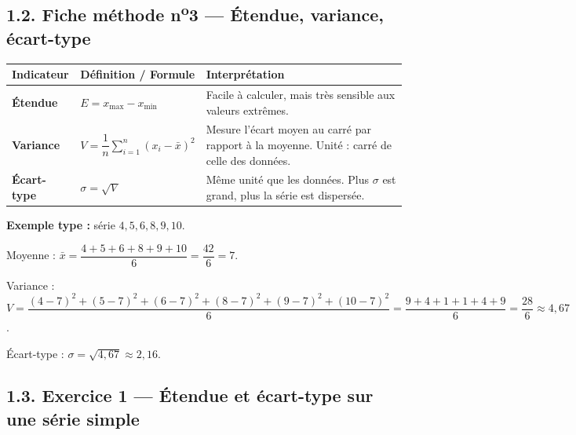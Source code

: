 \documentclass[11pt,a4paper]{article}
\begin{document}
\subsection*{1.2. Fiche méthode n\textsuperscript{o}3 — Étendue, variance, écart-type}

\begin{rappel}[title={\textbf{Fiche méthode — Indicateurs de dispersion}}]
\begin{tabularx}{\linewidth}{|p{2.6cm}|X|p{3.6cm}|}
\hline
\textbf{Indicateur} & \textbf{Définition / Formule} & \textbf{Interprétation} \\
\hline
\textbf{Étendue} & $E = x_{\max} - x_{\min}$ & Facile à calculer, mais très sensible aux valeurs extrêmes. \\
\hline
\textbf{Variance} & $V = \dfrac{1}{n}\displaystyle\sum_{i=1}^{n}(x_i - \bar{x})^2$ & Mesure l'écart moyen au carré par rapport à la moyenne. Unité : carré de celle des données. \\
\hline
\textbf{Écart-type} & $\sigma = \sqrt{V}$ & Même unité que les données. Plus $\sigma$ est grand, plus la série est dispersée. \\
\hline
\end{tabularx}

\vspace{0.2cm}
\textbf{Exemple type :} série $4, 5, 6, 8, 9, 10$.

Moyenne : $\bar{x} = \dfrac{4+5+6+8+9+10}{6} = \dfrac{42}{6} = 7$.

Variance : $V = \dfrac{(4-7)^2 + (5-7)^2 + (6-7)^2 + (8-7)^2 + (9-7)^2 + (10-7)^2}{6} = \dfrac{9+4+1+1+4+9}{6} = \dfrac{28}{6} \approx 4{,}67$.

Écart-type : $\sigma = \sqrt{4{,}67} \approx 2{,}16$.
\end{rappel}

\subsection*{1.3. Exercice 1 — Étendue et écart-type sur une série simple}
\end{document}
